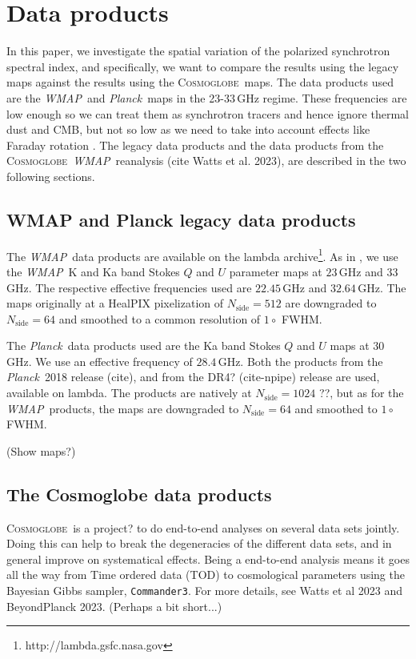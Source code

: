 \documentclass[twocolumn]{../../common/aa}
\def\WMAP{\emph{WMAP}}
\def\Planck{\emph{Planck}}
\def\commanderthree{\texttt{Commander3}}
\newcommand{\cosmoglobe}{\textsc{Cosmoglobe}}
\newcommand{\Cosmoglobe}{\textsc{Cosmoglobe}}
\begin{document}
\section{Data products}
\label{sec:data}

In this paper, we investigate the spatial variation of the polarized synchrotron spectral index, and specifically, we want to compare the results using the legacy maps against the results using the \cosmoglobe\ maps. The data products used are the \WMAP\ and \Planck\ maps in the 23-33\,GHz regime. These frequencies are low enough so we can treat them as synchrotron tracers and hence ignore thermal dust and CMB, but not so low as we need to take into account effects like Faraday rotation \citep{fuskeland:2019}. The legacy data products and the data products from the \cosmoglobe\ \WMAP\ reanalysis (cite Watts et al. 2023), are described in the two following sections.


\subsection{WMAP and Planck legacy data products}
\label{sec:wmap_data}

The \WMAP\ data products are available on the lambda archive\footnote{http://lambda.gsfc.nasa.gov}. As in \citet{fuskeland2014}, we use the \WMAP\ K and Ka band Stokes $Q$ and $U$ parameter maps at $23$\,GHz and $33$\,GHz. The respective effective frequencies used are $22.45$\,GHz and $32.64$\,GHz. The maps originally at a HealPIX pixelization of $N_\textrm{side}=512$ are downgraded to $N_\textrm{side}=64$ and smoothed to a common resolution of $1\circ$ FWHM.

The \Planck\ data products used are the Ka band Stokes $Q$ and $U$ maps at $30$\,GHz. We use an effective frequency of $28.4$\,GHz. Both the products from the \Planck\ 2018 release (cite), and from the DR4? (cite-npipe) release are used, available on lambda. The products are natively at $N_\textrm{side}=1024$ ??, but as for the \WMAP\ products, the maps are downgraded to $N_\textrm{side}=64$ and smoothed to $1\circ$ FWHM.

(Show maps?)

\subsection{The Cosmoglobe data products}
\label{sec:cosmoglobe_data}

\Cosmoglobe\ is a project? to do end-to-end analyses on several data sets jointly. Doing this can help to break the degeneracies of the different data sets, and in general improve on systematical effects. Being a end-to-end analysis means it goes all the way from Time ordered data (TOD) to cosmological parameters using the Bayesian Gibbs sampler, \commanderthree. For more details, see Watts et al 2023 and BeyondPlanck 2023.
(Perhaps a bit short...)
\end{document}
